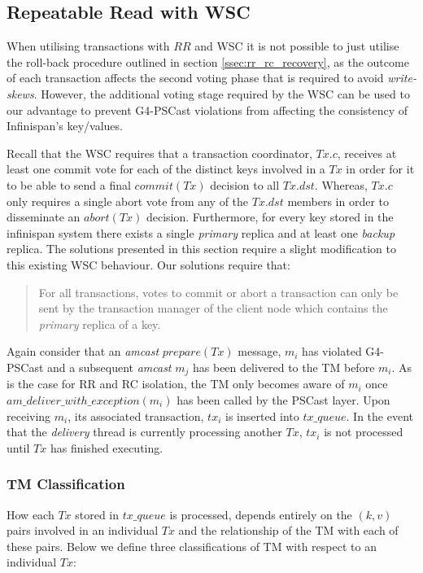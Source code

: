     \subsection{Repeatable Read with WSC}
        
        When utilising transactions with $RR$ and WSC it is not possible to just utilise the roll-back procedure outlined in section \ref{ssec:rr_rc_recovery}, as the outcome of each transaction affects the second voting phase that is required to avoid \emph{write-skews}.  However, the additional voting stage required by the WSC can be used to our advantage to prevent G4-PSCast violations from affecting the consistency of Infinispan's key/values.  
        
        Recall that the WSC requires that a transaction coordinator, $Tx.c$, receives at least one commit vote for each of the distinct keys involved in a $Tx$ in order for it to be able to send a final $commit(Tx)$ decision to all $Tx.dst$.  Whereas, $Tx.c$ only requires a single abort vote from any of the $Tx.dst$ members in order to disseminate an $abort(Tx)$ decision.  Furthermore, for every key stored in the infinispan system there exists a single \emph{primary} replica and at least one \emph{backup} replica.  The solutions presented in this section require a slight modification to this existing WSC behaviour.  Our solutions require that: 

\begin{quotation}    
    For all transactions, votes to commit or abort a transaction can only be sent by the transaction manager of the client node which contains the \emph{primary} replica of a key.  
\end{quotation}

    Again consider that an \emph{amcast} $prepare(Tx)$ message, $m_i$ has violated G4-PSCast and a subsequent \emph{amcast} $m_j$ has been delivered to the TM before $m_i$.  As is the case for RR and RC isolation, the TM only becomes aware of $m_i$ once $am\_deliver\_with\_exception(m_i)$ has been called by the \textsf{PSCast} layer.  Upon receiving $m_i$, its associated transaction, $tx_i$ is inserted into $tx\_queue$.  In the event that the \emph{delivery} thread is currently processing another $Tx$, $tx_i$ is not processed until $Tx$ has finished executing.  
    
    \subsubsection*{TM Classification}    
    How each $Tx$ stored in $tx\_queue$ is processed, depends entirely on the $(k,v)$ pairs involved in an individual $Tx$ and the relationship of the TM with each of these pairs.  Below we define three classifications of TM with respect to an individual $Tx$:
    
